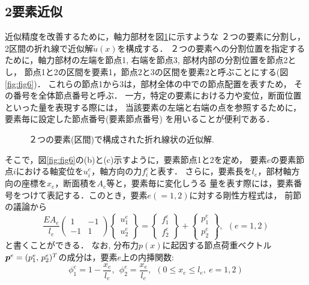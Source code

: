 \documentclass[10pt,a4j]{jarticle}
\begin{document}
\subsection{2要素近似}
近似精度を改善するために，軸力部材を図\ref{fig:fig10}に示すような
２つの要素に分割し，2区間の折れ線で近似解$\tilde u(x)$を構成する．
２つの要素への分割位置を指定するために，軸力部材の左端を節点1, 
右端を節点3, 部材内部の分割位置を節点2とし，
節点1と2の区間を要素1，節点2と3の区間を要素2と呼ぶことにする(図\ref{fig:fig6})．
これらの節点1から3は，部材全体の中での節点配置を表すため，
その番号を全体節点番号と呼ぶ．
一方，特定の要素における力や変位，断面位置といった量を表現する際には，
当該要素の左端と右端の点を参照するために，要素毎に設定した節点番号(要素節点番号)
を用いることが便利である．
\begin{figure}[h]
	\begin{center}
	\end{center}
	\caption{２つの要素(区間)で構成された折れ線状の近似解.} 
	\label{fig:fig10}
\end{figure}
そこで，図\ref{fig:fig6}の(b)と(c)示すように，要素節点1と2を定め，
要素$e$の要素節点$i$における軸変位を$u^e_i$，軸方向の力$f^e_i$と表す．
さらに，要素長を$l_e$，部材軸方向の座標を$x_e$，断面積を$A_e$等と，要素毎に変化しうる
量を表す際には，要素番号をつけて表記する．このとき，要素$e(=1,2)$に対する剛性方程式は，
前節の議論から
\begin{equation}
	\frac{EA_e}{l_e}
	\left(
	\begin{array}{cc}
		1 & -1  \\
		-1 & 1 
	\end{array}
	\right)
	\left\{
	\begin{array}{c}
		u^e_1 \\
		u^e_2
	\end{array}
	\right\}
	=
	\left\{
	\begin{array}{c}
		f^e_1  \\
		f^e_2 
	\end{array}
	\right\}
	+
	\left\{
	\begin{array}{c}
		p^e_1 \\
		p^e_2 
	\end{array}
	\right\}, 
	\ \ 
	(e=1,2)
	\label{eqn:fe_eq_e}
\end{equation}
と書くことができる．
なお, 分布力$p(x)$に起因する節点荷重ベクトル$\mbox{\boldmath $p$}^e=(p^e_1,\, p^e_2)^T$の成分は，要素$e$上の内挿関数:
\begin{equation}
	\phi^e_1=1-\frac{x_e}{l_e}, \ \ 
	\phi^e_2=\frac{x_e}{l_e}, \ \ (0\leq x_e \leq l_e, \ e=1,2)
	\label{eqn:phi_e_i}
\end{equation}
\end{document}
